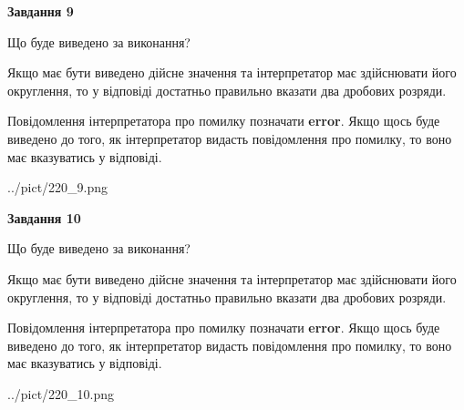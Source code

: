 \documentclass[12pt, ukrainian]{article}
\begin{document}
{\begin {Large}
{\begin {center}\textbf{Завдання 9}\end {center}}\par
Що буде виведено за виконання? \par

Якщо має бути виведено дійсне значення та інтерпретатор має здійснювати його округлення, 
то у відповіді достатньо правильно вказати два дробових розряди.

Повідомлення інтерпретатора про помилку позначати \textbf{error}.
Якщо щось буде виведено до того, як інтерпретатор видасть повідомлення про помилку, 
то воно має вказуватись у відповіді. \par

\begin{center}
	{../pict/220_9.png}
\end{center}
\newpage

{\begin {center}\textbf{Завдання 10}\end {center}}\par
Що буде виведено за виконання? \par

Якщо має бути виведено дійсне значення та інтерпретатор має здійснювати його округлення, 
то у відповіді достатньо правильно вказати два дробових розряди.

Повідомлення інтерпретатора про помилку позначати \textbf{error}.
Якщо щось буде виведено до того, як інтерпретатор видасть повідомлення про помилку, 
то воно має вказуватись у відповіді. \par

\begin{center}
	{../pict/220_10.png}
\end{center}
\newpage

\end {Large}}
\end{document}

